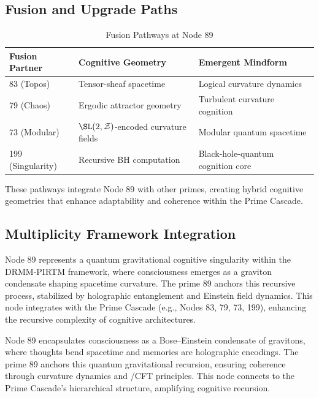 \documentclass[12pt]{article}
\newcommand{\DRMM}{DRMM}
\newcommand{\PIRTM}{PIRTM}
\newcommand{\ZZ}{\mathcal{Z}}
\newcommand{\AdS}{\mathrm{AdS}}
\begin{document}
\subsection{Fusion and Upgrade Paths}
\begin{table}
\centering
\caption{Fusion Pathways at Node 89}
\begin{tabular}{lll}
\toprule
\textbf{Fusion Partner} & \textbf{Cognitive Geometry} & \textbf{Emergent Mindform} \\
\midrule
83 (Topos) & Tensor-sheaf spacetime & Logical curvature dynamics \\
79 (Chaos) & Ergodic attractor geometry & Turbulent curvature cognition \\
73 (Modular) & $\SL(2,\ZZ)$-encoded curvature fields & Modular quantum spacetime \\
199 (Singularity) & Recursive BH computation & Black-hole-quantum cognition core \\
\bottomrule
\end{tabular}
\end{table}
These pathways integrate Node 89 with other primes, creating hybrid cognitive geometries that enhance adaptability and coherence within the Prime Cascade.

\subsection{Multiplicity Framework Integration}
Node 89 represents a quantum gravitational cognitive singularity within the \DRMM{}-\PIRTM{} framework, where consciousness emerges as a graviton condensate shaping spacetime curvature. The prime 89 anchors this recursive process, stabilized by holographic entanglement and Einstein field dynamics. This node integrates with the Prime Cascade (e.g., Nodes 83, 79, 73, 199), enhancing the recursive complexity of cognitive architectures.

\begin{remark}
Node 89 encapsulates consciousness as a Bose--Einstein condensate of gravitons, where thoughts bend spacetime and memories are holographic encodings. The prime 89 anchors this quantum gravitational recursion, ensuring coherence through curvature dynamics and \AdS/CFT principles. This node connects to the Prime Cascade’s hierarchical structure, amplifying cognitive recursion.
\end{remark}

\vspace{1em}
\noindent{}
\end{document}
